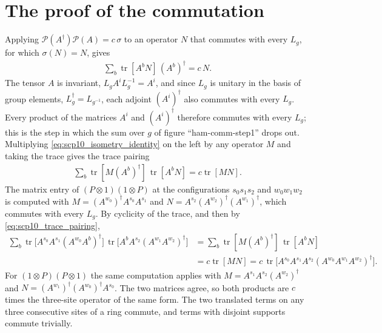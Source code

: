 \documentclass{article}
\begin{document}
\section{The proof of the commutation}
Applying $\mathcal P(A^\dagger)\mathcal P(A)=c\,\sigma$ to an operator $N$
that commutes with every $L_g$, for which $\sigma(N)=N$, gives
\begin{align}
    \sum_b\operatorname{tr}[A^bN]\,(A^b)^\dagger=c\,N .
    \label{eq:scp10_isometry_identity}
\end{align}
The tensor $A$ is invariant, $L_gA^iL_g^{-1}=A^i$, and since $L_g$ is unitary
in the basis of group elements, $L_g^\dagger=L_{g^{-1}}$, each adjoint
$(A^i)^\dagger$ also commutes with every $L_g$. Every product of the
matrices $A^i$ and $(A^i)^\dagger$ therefore commutes with every $L_g$; this
is the step in which the sum over $g$ of figure ``ham-comm-step1'' drops out.
Multiplying \eqref{eq:scp10_isometry_identity} on the left by any operator
$M$ and taking the trace gives the trace pairing
\begin{align}
    \sum_b\operatorname{tr}[M(A^b)^\dagger]\,\operatorname{tr}[A^bN]
    =c\operatorname{tr}[MN].
    \label{eq:scp10_trace_pairing}
\end{align}
The matrix entry of $(P\otimes1)(1\otimes P)$ at the configurations
$s_0s_1s_2$ and $w_0w_1w_2$ is computed with
$M=(A^{w_0})^\dagger A^{s_0}A^{s_1}$ and
$N=A^{s_2}(A^{w_2})^\dagger(A^{w_1})^\dagger$, which commutes with every
$L_g$. By cyclicity of the trace, and then by
\eqref{eq:scp10_trace_pairing},
\begin{align}
    \sum_b\operatorname{tr}\bigl[A^{s_0}A^{s_1}(A^{w_0}A^b)^\dagger\bigr]\,
        \operatorname{tr}\bigl[A^bA^{s_2}(A^{w_1}A^{w_2})^\dagger\bigr]
    &=\sum_b\operatorname{tr}[M(A^b)^\dagger]\,\operatorname{tr}[A^bN]
    \nonumber\\
    &=c\operatorname{tr}[MN]
    =c\,\operatorname{tr}\bigl[A^{s_0}A^{s_1}A^{s_2}
        (A^{w_0}A^{w_1}A^{w_2})^\dagger\bigr].
    \label{eq:scp10_three_site_entry}
\end{align}
For $(1\otimes P)(P\otimes1)$ the same computation applies with
$M=A^{s_1}A^{s_2}(A^{w_2})^\dagger$ and
$N=(A^{w_1})^\dagger(A^{w_0})^\dagger A^{s_0}$.
The two matrices agree, so both products are
$c$ times the three-site operator of the same form. The two translated terms
on any three consecutive sites of a ring commute, and terms with disjoint
supports commute trivially.
\end{document}
